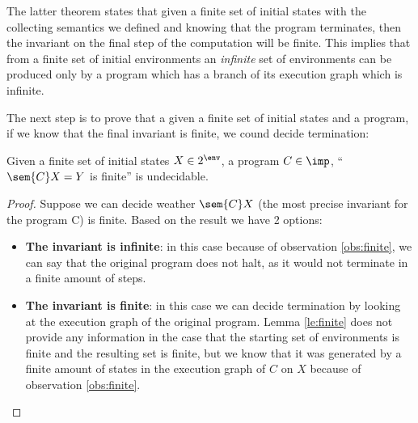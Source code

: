 \begin{observation}\label{obs:finite}
  The latter theorem states that given a finite set of initial states
  with the collecting semantics we defined and knowing that the
  program terminates, then the invariant on the final step of the
  computation will be finite. This implies that from a finite set of
  initial environments an \emph{infinite} set of environments can be
  produced only by a program which has a branch of its execution graph
  which is infinite.
\end{observation}

The next step is to prove that a given a finite set of initial states
and a program, if we know that the final invariant is finite, we cound
decide termination:

\begin{lemma}
  Given a finite set of initial states \(X \in 2^\env\), a program
  \(C\in\imp\), ``\(\sem{C}X = Y\) is finite'' is undecidable.
\end{lemma}

\begin{proof}
  Suppose we can decide weather \(\sem{C}X\) (the most precise
  invariant for the program C) is finite. Based on the result we have
  2 options:
  \begin{itemize}
  \item \textbf{The invariant is infinite}: in this case because of
    observation \ref{obs:finite}, we can say that the original program
    does not halt, as it would not terminate in a finite amount of
    steps.
  \item \textbf{The invariant is finite}: in this case we can decide
    termination by looking at the execution graph of the original
    program. Lemma \ref{le:finite} does not provide any information in
    the case that the starting set of environments is finite and the
    resulting set is finite, but we know that it was generated by a
    finite amount of states in the execution graph of \(C\) on \(X\)
    because of observation \ref{obs:finite}. 
  \end{itemize}
\end{proof}
